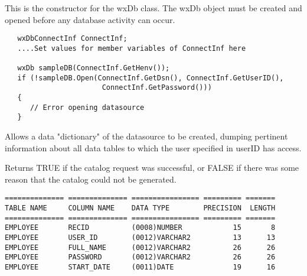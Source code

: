 



This is the constructor for the wxDb class.  The wxDb object must
be created and opened before any database activity can occur.


\begin{verbatim}
   wxDbConnectInf ConnectInf;
   ....Set values for member variables of ConnectInf here

   wxDb sampleDB(ConnectInf.GetHenv());
   if (!sampleDB.Open(ConnectInf.GetDsn(), ConnectInf.GetUserID(),
	                   ConnectInf.GetPassword()))
   {
      // Error opening datasource
   }
\end{verbatim}



\label{wxdbcatalog}


Allows a data "dictionary" of the datasource to be created, dumping pertinent
information about all data tables to which the user specified in userID has
access.





Returns TRUE if the catalog request was successful, or FALSE if there was some
reason that the catalog could not be generated.


\begin{verbatim}
============== ============== ================ ========= =======
TABLE NAME     COLUMN NAME    DATA TYPE        PRECISION  LENGTH
============== ============== ================ ========= =======
EMPLOYEE       RECID          (0008)NUMBER            15       8
EMPLOYEE       USER_ID        (0012)VARCHAR2          13      13
EMPLOYEE       FULL_NAME      (0012)VARCHAR2          26      26
EMPLOYEE       PASSWORD       (0012)VARCHAR2          26      26
EMPLOYEE       START_DATE     (0011)DATE              19      16
\end{verbatim}


